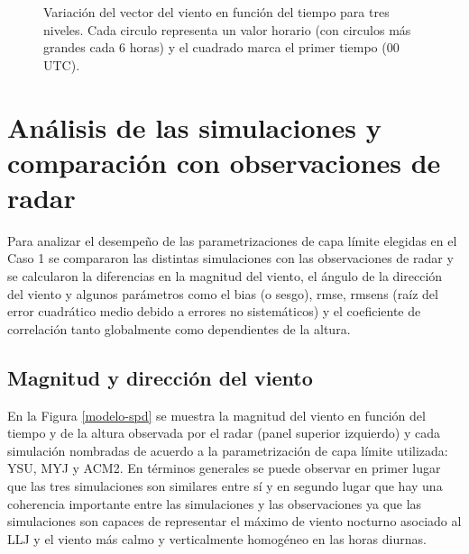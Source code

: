 \documentclass[12pt,spanish,oneside, a4paper]{book}
\begin{document}
\begin{figure}

{\centering {}\newline{}

}

\caption{Variación del vector del viento en función del tiempo para tres niveles. Cada circulo representa un valor horario (con circulos más grandes cada 6 horas) y el cuadrado marca el primer tiempo (00 UTC). \label{hodografa-n}}\label{fig:hodografa-nivel}
\end{figure}

\section{Análisis de las simulaciones y comparación con observaciones de
radar}\label{analisis-de-las-simulaciones-y-comparacion-con-observaciones-de-radar}

Para analizar el desempeño de las parametrizaciones de capa límite
elegidas en el Caso 1 se compararon las distintas simulaciones con las
observaciones de radar y se calcularon la diferencias en la magnitud del
viento, el ángulo de la dirección del viento y algunos parámetros como
el bias (o sesgo), rmse, rmsens (raíz del error cuadrático medio debido
a errores no sistemáticos) y el coeficiente de correlación tanto
globalmente como dependientes de la altura.

\subsection{Magnitud y dirección del
viento}\label{magnitud-y-direccion-del-viento}

En la Figura \ref{modelo-spd} se muestra la magnitud del viento en
función del tiempo y de la altura observada por el radar (panel superior
izquierdo) y cada simulación nombradas de acuerdo a la parametrización
de capa límite utilizada: YSU, MYJ y ACM2. En términos generales se
puede observar en primer lugar que las tres simulaciones son similares
entre sí y en segundo lugar que hay una coherencia importante entre las
simulaciones y las observaciones ya que las simulaciones son capaces de
representar el máximo de viento nocturno asociado al LLJ y el viento más
calmo y verticalmente homogéneo en las horas diurnas.
\end{document}
